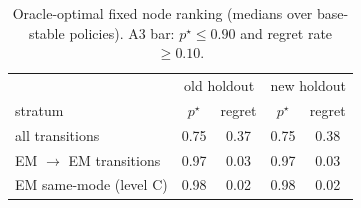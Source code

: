 \begin{table}[!t]
\centering
\caption{Oracle-optimal fixed node ranking (medians over base-stable policies). A3 bar: $p^\star\le0.90$ and regret rate $\ge0.10$.}\label{tab:ranking}
\footnotesize
\begin{tabular}{@{}lcccc@{}}
\toprule
& \multicolumn{2}{c}{old holdout} & \multicolumn{2}{c}{new holdout}\\
stratum & $p^\star$ & regret & $p^\star$ & regret \\
\midrule
all transitions & 0.75 & 0.37 & 0.75 & 0.38 \\
EM $\to$ EM transitions & 0.97 & 0.03 & 0.97 & 0.03 \\
EM same-mode (level C) & 0.98 & 0.02 & 0.98 & 0.02 \\
\bottomrule
\end{tabular}
\end{table}

